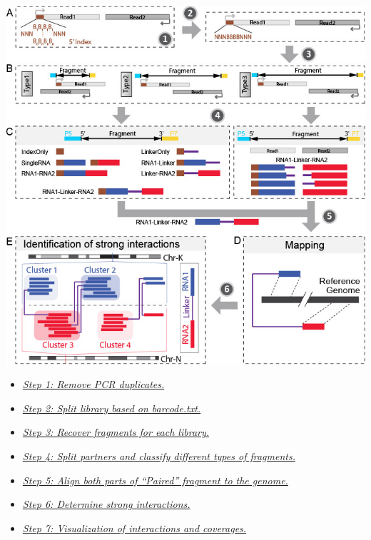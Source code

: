 \documentclass[letterpaper,10pt,english]{sphinxmanual}
\begin{document}
{\hfill\includegraphics{pipeline.jpg}\hfill}
\begin{itemize}
\item {} 
{\hyperref[Analysis_pipeline:step1]{\emph{Step 1: Remove PCR duplicates.}}}

\item {} 
{\hyperref[Analysis_pipeline:step2]{\emph{Step 2: Split library based on barcode.txt.}}}

\item {} 
{\hyperref[Analysis_pipeline:step3]{\emph{Step 3: Recover fragments for each library.}}}

\item {} 
{\hyperref[Analysis_pipeline:step4]{\emph{Step 4: Split partners and classify different types of fragments.}}}

\item {} 
{\hyperref[Analysis_pipeline:step5]{\emph{Step 5: Align both parts of ``Paired'' fragment to the genome.}}}

\item {} 
{\hyperref[Analysis_pipeline:step6]{\emph{Step 6: Determine strong interactions.}}}

\item {} 
{\hyperref[Analysis_pipeline:step7]{\emph{Step 7: Visualization of interactions and coverages.}}}

\end{itemize}
\end{document}
